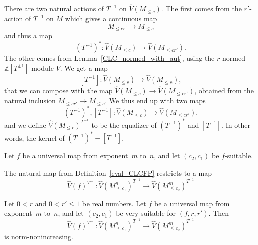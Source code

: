\begin{definition}
  \label{CLCFPTinv}
  \leanok
  There are two natural actions of $T^{-1}$ on $\hat V(M_{\le c})$.
  The first comes from the $r'$-action of $T^{-1}$ on $M$
  which gives a continuous map
  \[
    M_{\le cr'} \to M_{\le c}
  \]
  and thus a map
  \[
    (T^{-1})^* \colon \hat V(M_{\le c}) \to \hat V(M_{\le cr'}).
  \]
  The other comes from Lemma~\ref{CLC_normed_with_aut},
  using the $r$-normed $\mathbb Z[T^{\pm 1}]$-module $V$.
  We get a map
  \[
    [T^{-1}] \colon \hat V(M_{\le c}) \to \hat V(M_{\le c}),
  \]
  that we can compose with the map
  $\hat V(M_{\le c}) \to \hat V(M_{\le cr'})$,
  obtained from the natural inclusion $M_{\le cr'} \to M_{\le c}$.
  We thus end up with two maps
  \[
    (T^{-1})^*, [T^{-1}] \colon \hat V(M_{\le c}) \to \hat V(M_{\le cr'}).
  \]
  and we define $\hat V(M_{\le c})^{T^{-1}}$
  to be the equalizer of $(T^{-1})^*$ and $[T^{-1}]$.
  In other words, the kernel of $(T^{-1})^* - [T^{-1}]$.
\end{definition}

\begin{definition}
  \label{eval_CLCFPTinv}
  \leanok
  Let $f$ be a universal map from exponent~$m$ to~$n$,
  and let $(c_2, c_1)$ be $f$-suitable.

  The natural map from Definition~\ref{eval_CLCFP}
  restricts to a map
  \[
    \hat V(f)^{T^{-1}} \colon \hat V(M_{\le c_1}^n)^{T^{-1}} \to \hat V(M_{\le c_2}^m)^{T^{-1}}
  \]
\end{definition}

\begin{lemma}
  \label{eval_CLCFPTinv_norm_noninc}
  \leanok
  Let $0 < r$ and $0 < r' \le 1$ be real numbers.
  Let $f$ be a universal map from exponent~$m$ to~$n$,
  and let $(c_2, c_1)$ be very suitable for $(f, r, r')$.
  Then
  \[
    \hat V(f)^{T^{-1}} \colon \hat V(M_{\le c_1}^n)^{T^{-1}} \to \hat V(M_{\le c_2}^m)^{T^{-1}}
  \]
  is norm-nonincreasing.
\end{lemma}

